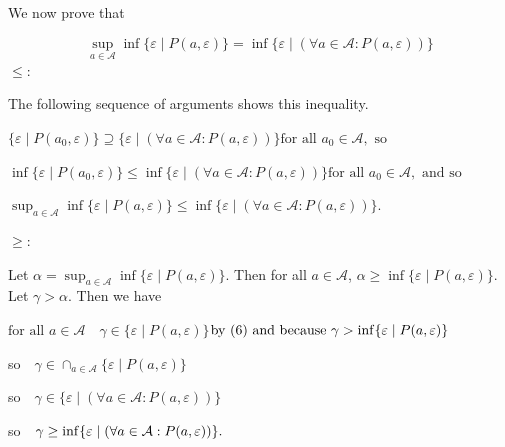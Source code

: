 \documentclass[10pt,a4paper]{article}
\begin{document}
We now prove that\par
  
\par  \quad  \[\sup_{a\in\mathcal{A}}\inf\{\varepsilon\mid P(a,\varepsilon)\}=\inf\{\varepsilon\mid(\forall a\in\mathcal{A}:P(a,\varepsilon))\}\]\quad  \quad  
   $\leq$:  
 
The following sequence of arguments shows this inequality.\par
  
\par  \quad  $\displaystyle\{\varepsilon\mid P(a_{0},\varepsilon)\}$\quad  $\displaystyle\supseteq\{\varepsilon\mid(\forall a\in\mathcal{A}:P(a,\varepsilon))\}$\quad  $\displaystyle\mbox{for all }a_{0}\in\mathcal{A},\mbox{ so}$\quad  \quad  
 
\par  \quad  $\displaystyle\inf\{\varepsilon\mid P(a_{0},\varepsilon)\}$\quad  $\displaystyle\leq\inf\{\varepsilon\mid(\forall a\in\mathcal{A}:P(a,\varepsilon))\}$\quad  $\displaystyle\mbox{for all }a_{0}\in\mathcal{A},\mbox{ and so}$\quad  \quad  
 
\par  \quad  $\displaystyle\sup_{a\in\mathcal{A}}\inf\{\varepsilon\mid P(a,\varepsilon)\}$\quad  $\displaystyle\leq\inf\{\varepsilon\mid(\forall a\in\mathcal{A}:P(a,\varepsilon))\}.$\quad  \quad  
  
  $\geq$:  
 
Let $\alpha=\sup_{a\in\mathcal{A}}\inf\{\varepsilon\mid P(a,\varepsilon)\}.$ Then for all $a\in\mathcal{A}$, $\alpha\geq\inf\{\varepsilon\mid P(a,\varepsilon)\}.$ Let $\gamma>\alpha$. Then we have\par
  
\par  \quad  $\displaystyle\mbox{for all }a\in\mathcal{A}$\quad  $\displaystyle\quad\gamma\in\{\varepsilon\mid P(a,\varepsilon)\}$\quad  $\displaystyle\mbox{by\nobreak\ (6) and because }\gamma>\inf\{\varepsilon\mid P(a,\varepsilon)\}$\quad  \quad  
 
\par  \quad  so\quad  $\displaystyle\quad\gamma\in\cap_{a\in\mathcal{A}}\{\varepsilon\mid P(a,\varepsilon)\}$\quad  \quad  
 
\par  \quad  so\quad  $\displaystyle\quad\gamma\in\{\varepsilon\mid(\forall a\in\mathcal{A}:P(a,\varepsilon))\}$\quad  \quad  
 
\par  \quad  so\quad  $\displaystyle\quad\gamma\geq\inf\{\varepsilon\mid(\forall a\in\mathcal{A}:P(a,\varepsilon))\}.\hskip-11.38109pt$\quad  \quad  
  
\end{document}
